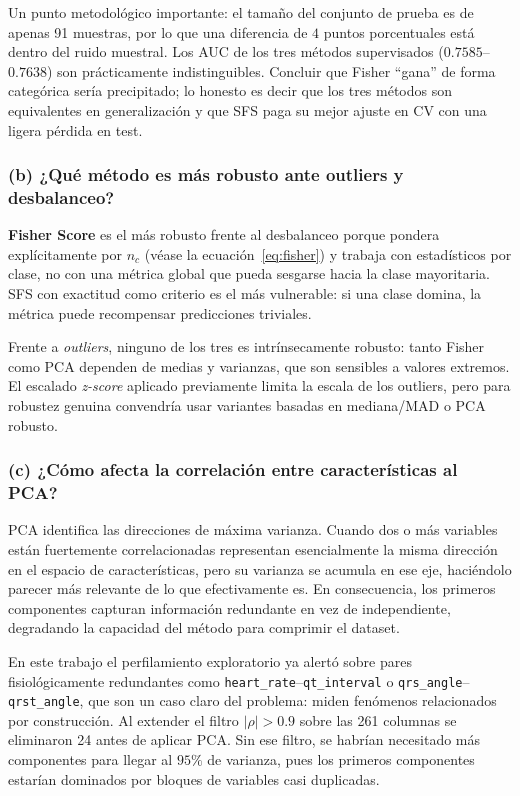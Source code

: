 Un punto metodológico importante: el tamaño del conjunto de prueba es de
apenas 91 muestras, por lo que una diferencia de $4$ puntos porcentuales
está dentro del ruido muestral. Los AUC de los tres métodos supervisados
($0.7585$--$0.7638$) son prácticamente indistinguibles. Concluir que
Fisher ``gana'' de forma categórica sería precipitado; lo honesto es decir
que los tres métodos son equivalentes en generalización y que SFS paga su
mejor ajuste en CV con una ligera pérdida en test.

\subsubsection*{(b) ¿Qué método es más robusto ante outliers y desbalanceo?}

\textbf{Fisher Score} es el más robusto frente al desbalanceo porque
pondera explícitamente por $n_c$ (véase la ecuación~\ref{eq:fisher}) y
trabaja con estadísticos por clase, no con una métrica global que pueda
sesgarse hacia la clase mayoritaria. SFS con exactitud como criterio es el
más vulnerable: si una clase domina, la métrica puede recompensar
predicciones triviales.

Frente a \textit{outliers}, ninguno de los tres es intrínsecamente robusto:
tanto Fisher como PCA dependen de medias y varianzas, que son sensibles a
valores extremos. El escalado \textit{z-score} aplicado previamente
limita la escala de los outliers, pero para robustez genuina convendría
usar variantes basadas en mediana/MAD o PCA robusto.

\subsubsection*{(c) ¿Cómo afecta la correlación entre características al PCA?}

PCA identifica las direcciones de máxima varianza. Cuando dos o más
variables están fuertemente correlacionadas representan esencialmente la
misma dirección en el espacio de características, pero su varianza se
acumula en ese eje, haciéndolo parecer más relevante de lo que
efectivamente es. En consecuencia, los primeros componentes capturan
información redundante en vez de independiente, degradando la capacidad
del método para comprimir el dataset.

En este trabajo el perfilamiento exploratorio ya alertó sobre pares
fisiológicamente redundantes como \texttt{heart\_rate}--\texttt{qt\_interval}
o \texttt{qrs\_angle}--\texttt{qrst\_angle}, que son un caso claro del
problema: miden fenómenos relacionados por construcción. Al extender el
filtro $|\rho|>0.9$ sobre las 261 columnas se eliminaron 24 antes de
aplicar PCA. Sin ese filtro, se habrían necesitado más componentes para
llegar al $95\%$ de varianza, pues los primeros componentes estarían
dominados por bloques de variables casi duplicadas.

